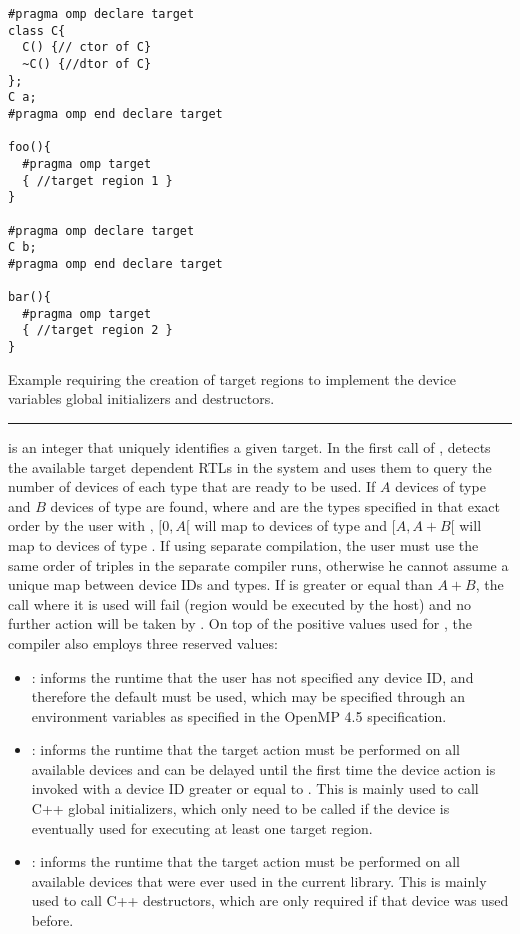 \begin{example}
\lstset{basicstyle=\scriptsize,frame=single}
\begin{lstlisting}
#pragma omp declare target
class C{
  C() {// ctor of C}
  ~C() {//dtor of C}
};
C a;
#pragma omp end declare target

foo(){
  #pragma omp target
  { //target region 1 }
}

#pragma omp declare target
C b;
#pragma omp end declare target

bar(){
  #pragma omp target
  { //target region 2 }
}
\end{lstlisting}
\lstset{basicstyle=\small\bfseries,frame=none}
\caption{Example requiring the creation of target regions to implement the device variables global initializers and destructors.}
\label{ex:EntriesOrdering}
\end{example}
%

\noindent\rule{\textwidth}{0.4pt}

 is an integer that uniquely identifies a given target. In the first call of , \libomptarget{} detects the available target dependent RTLs in the system and uses them to query the number of devices of each type that are ready to be used. If $A$ devices of type  and $B$ devices of type  are found, where  and  are the types specified in that exact order by the user with ,  $[0,A[$ will map to devices of type  and  $[A,A+B[$ will map to devices of type . If using separate compilation, the user must use the same order of triples in the separate compiler runs, otherwise he cannot assume a unique map between device IDs and types.  If  is greater or equal than $A+B$, the call where it is used will fail (region would be executed by the host) and no further action will be taken by \libomptarget{}. On top of the positive values used for , the compiler also employs three reserved values:

\begin{itemize}
  \item {}: informs the runtime that the user has not specified any device ID, and therefore the default must be used, which may be specified through an environment variables as specified in the OpenMP 4.5 specification.

  \item {}: informs the runtime that the target action must be performed on all available devices and can be delayed until the first time the device action is invoked with a device ID greater or equal to . This is mainly used to call C++ global initializers, which only need to be called if the device is eventually used for executing at least one target region.

  \item {}: informs the runtime that the target action must be performed on all available devices that were ever used in the current library. This is mainly used to call C++ destructors, which are only required if that device was used before.
\end{itemize}


